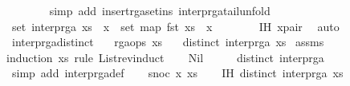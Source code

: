 \begin{isabellebody}
\ \ \ \ \ \ \isamarkupfalse%
\ {\isacharparenleft}simp\ add{\isacharcolon}\ insert{\isacharunderscore}rga{\isacharunderscore}set{\isacharunderscore}ins\ interp{\isacharunderscore}rga{\isacharunderscore}tail{\isacharunderscore}unfold{\isacharparenright}\isanewline
\ \ \ \ \isamarkupfalse%
\ \isamarkupfalse%
\ {\isachardoublequoteopen}set\ {\isacharparenleft}interp{\isacharunderscore}rga\ {\isacharparenleft}xs\ {\isacharat}\ {\isacharbrackleft}x{\isacharbrackright}{\isacharparenright}{\isacharparenright}\ {\isacharequal}\ set\ {\isacharparenleft}map\ fst\ {\isacharparenleft}xs\ {\isacharat}\ {\isacharbrackleft}x{\isacharbrackright}{\isacharparenright}{\isacharparenright}{\isachardoublequoteclose}\isanewline
\ \ \ \ \ \ \isamarkupfalse%
\ IH\ x{\isacharunderscore}pair\ \isamarkupfalse%
\ auto\isanewline
\ \ \isamarkupfalse%
\isanewline
{}\isamarkupfalse%
%
\endisatagproof
{\isafoldproof}%
%
\isadelimproof
\isanewline
%
\endisadelimproof
\isanewline
{}\isamarkupfalse%
\ interp{\isacharunderscore}rga{\isacharunderscore}distinct{\isacharcolon}\isanewline
\ \ \ {\isachardoublequoteopen}rga{\isacharunderscore}ops\ xs{\isachardoublequoteclose}\isanewline
\ \ \ {\isachardoublequoteopen}distinct\ {\isacharparenleft}interp{\isacharunderscore}rga\ xs{\isacharparenright}{\isachardoublequoteclose}\isanewline
%
\isadelimproof
%
\endisadelimproof
%
\isatagproof
{}\isamarkupfalse%
\ assms\ \isamarkupfalse%
{\isacharparenleft}induction\ xs\ rule{\isacharcolon}\ List{\isachardot}rev{\isacharunderscore}induct{\isacharparenright}\isanewline
\ \ \isamarkupfalse%
\ Nil\isanewline
\ \ \isamarkupfalse%
\ \isamarkupfalse%
\ {\isachardoublequoteopen}distinct\ {\isacharparenleft}interp{\isacharunderscore}rga\ {\isacharbrackleft}{\isacharbrackright}{\isacharparenright}{\isachardoublequoteclose}\ \isamarkupfalse%
\ {\isacharparenleft}simp\ add{\isacharcolon}\ interp{\isacharunderscore}rga{\isacharunderscore}def{\isacharparenright}\isanewline
{}\isamarkupfalse%
\isanewline
\ \ \isamarkupfalse%
\ {\isacharparenleft}snoc\ x\ xs{\isacharparenright}\isanewline
\ \ \isamarkupfalse%
\ IH{\isacharcolon}\ {\isachardoublequoteopen}distinct\ {\isacharparenleft}interp{\isacharunderscore}rga\ xs{\isacharparenright}{\isachardoublequoteclose}\isanewline
\ \ \ \ \isamarkupfalse%

\end{isabellebody}
